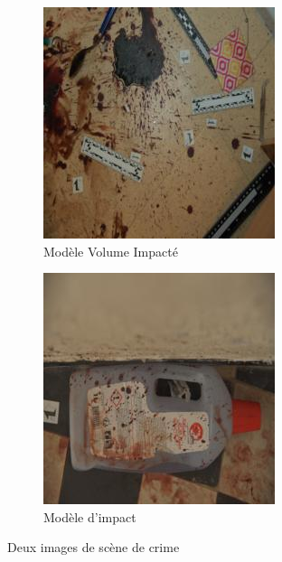 \documentclass[a4paper]{article}
\begin{document}
\begin{figure}[ht]
    \centering
    \begin{subfigure}{0.40\linewidth}
        \centering
        \includegraphics[width=\linewidth]{../asset/data_real/12.jpg}
        \caption{Modèle Volume Impacté}
    \end{subfigure}
    \begin{subfigure}{0.40\linewidth}
        \centering
        \includegraphics[width=\linewidth]{../asset/data_real/15.jpg}
        \caption{Modèle d'impact}
    \end{subfigure}
    \caption{Deux images de scène de crime}
    \label{fig: reals images}
\end{figure}
\end{document}
